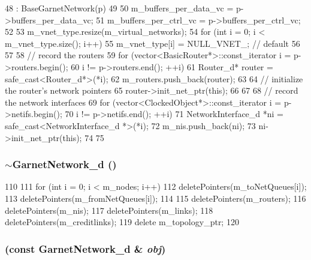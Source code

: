 \begin{DoxyCode}
48     : BaseGarnetNetwork(p)
49 {
50     m_buffers_per_data_vc = p->buffers_per_data_vc;
51     m_buffers_per_ctrl_vc = p->buffers_per_ctrl_vc;
52 
53     m_vnet_type.resize(m_virtual_networks);
54     for (int i = 0; i < m_vnet_type.size(); i++) {
55         m_vnet_type[i] = NULL_VNET_; // default
56     }
57 
58     // record the routers
59     for (vector<BasicRouter*>::const_iterator i =  p->routers.begin();
60          i != p->routers.end(); ++i) {
61         Router_d* router = safe_cast<Router_d*>(*i);
62         m_routers.push_back(router);
63 
64         // initialize the router's network pointers
65         router->init_net_ptr(this);
66     }
67 
68     // record the network interfaces
69     for (vector<ClockedObject*>::const_iterator i = p->netifs.begin();
70          i != p->netifs.end(); ++i) {
71         NetworkInterface_d *ni = safe_cast<NetworkInterface_d *>(*i);
72         m_nis.push_back(ni);
73         ni->init_net_ptr(this);
74     }
75 }
\end{DoxyCode}
\hypertarget{classGarnetNetwork__d_a89a93c1928f606aa3eceb0c4104d7b97}{
\subsubsection[{$\sim$GarnetNetwork\_\-d}]{\setlength{\rightskip}{0pt plus 5cm}$\sim${\bf GarnetNetwork\_\-d} ()}}
\label{classGarnetNetwork__d_a89a93c1928f606aa3eceb0c4104d7b97}



\begin{DoxyCode}
110 {
111     for (int i = 0; i < m_nodes; i++) {
112         deletePointers(m_toNetQueues[i]);
113         deletePointers(m_fromNetQueues[i]);
114     }
115     deletePointers(m_routers);
116     deletePointers(m_nis);
117     deletePointers(m_links);
118     deletePointers(m_creditlinks);
119     delete m_topology_ptr;
120 }
\end{DoxyCode}
\hypertarget{classGarnetNetwork__d_a4a6b33729b27f5aaeb2ec88768c33339}{
\subsubsection[{GarnetNetwork\_\-d}]{ (const {\bf GarnetNetwork\_\-d} \& {\em obj})}}
\label{classGarnetNetwork__d_a4a6b33729b27f5aaeb2ec88768c33339}


